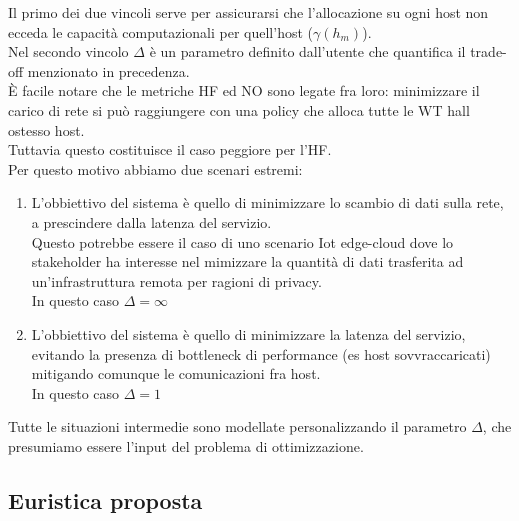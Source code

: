 \documentclass[11pt]{article}
\begin{document}
	Il primo dei due vincoli serve per assicurarsi che l'allocazione su ogni host non ecceda le capacità computazionali per quell'host ($\gamma(h_m)$). \\
	Nel secondo vincolo $\Delta$ è un parametro definito dall'utente che quantifica il trade-off menzionato in precedenza. \\
	È facile notare che le metriche HF ed NO sono legate fra loro: minimizzare il carico di rete si può raggiungere con una policy che alloca tutte le WT hall ostesso host. \\
	Tuttavia questo costituisce il caso peggiore per l'HF. \\
	Per questo motivo abbiamo due scenari estremi:
	\begin{enumerate}
		\item L'obbiettivo del sistema è quello di minimizzare lo scambio di dati sulla rete, a prescindere dalla latenza del servizio. \\
		Questo potrebbe essere il caso di uno scenario Iot edge-cloud dove lo stakeholder ha interesse nel mimizzare la quantità di dati trasferita ad un'infrastruttura remota per ragioni di privacy. \\
		In questo caso $\Delta = \infty$
		\item L'obbiettivo del sistema è quello di minimizzare la latenza del servizio, evitando la presenza di bottleneck di performance (es host sovvraccaricati) mitigando comunque le comunicazioni fra host. \\
		In questo caso $\Delta = 1$
	\end{enumerate}
	Tutte le situazioni intermedie sono modellate personalizzando il parametro $\Delta$, che presumiamo essere l'input del problema di ottimizzazione.
	\subsection{Euristica proposta}
	
	
\end{document}
